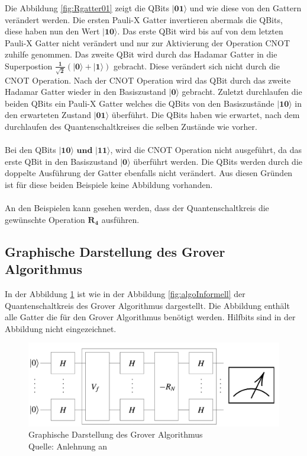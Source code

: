 \noindent
 Die Abbildung \ref{fig:Rgatter01} zeigt die QBits $\mathbf{|01\rangle}$  und wie diese von den Gattern verändert werden. Die ersten Pauli-X Gatter invertieren abermals die QBits, diese haben nun den Wert $\mathbf{|10\rangle}$. Das erste QBit wird bis auf von dem letzten Pauli-X Gatter nicht verändert und nur zur Aktivierung der Operation CNOT zuhilfe genommen. Das zweite QBit wird durch das Hadamar Gatter in die Superpostion $\mathbf{\frac{1}{\sqrt 2}(|0\rangle + |1\rangle)}$ gebracht. Diese verändert sich nicht durch die CNOT Operation. Nach der CNOT Operation wird das QBit durch das zweite Hadamar Gatter wieder in den Basiszustand $\mathbf{|0\rangle}$ gebracht. Zuletzt durchlaufen die beiden QBits ein Pauli-X Gatter welches die QBits von den Basiszustände $\mathbf{|10\rangle}$ in den erwarteten Zustand $\mathbf{|01\rangle}$ überführt. Die QBits haben wie erwartet, nach dem durchlaufen des Quantenschaltkreises die selben Zustände wie vorher.
  \\ 
  \\
Bei den QBits $\mathbf{|10\rangle \text{ und }|11\rangle}$, wird die CNOT Operation nicht ausgeführt, da das erste QBit in den Basiszustand $\mathbf{|0\rangle}$ überführt werden. Die QBits werden durch die doppelte Ausführung der Gatter ebenfalls nicht verändert. Aus diesen Gründen ist für diese beiden Beispiele keine Abbildung vorhanden.
\\
\\
An den Beispielen kann gesehen werden, dass der Quantenschaltkreis die gewünschte Operation $\mathbf{R_4}$ ausführen.

\subsection{Graphische Darstellung des Grover Algorithmus}
In der Abbildung \ref{fig:algoFormell} ist wie in der Abbildung \ref{fig:algoInformell} der Quantenschaltkreis des Grover Algorithmus dargestellt. Die Abbildung enthält alle Gatter die für den Grover Algorithmus benötigt werden. Hilfbits sind in der Abbildung nicht eingezeichnet.
\begin{figure}[hbtp]
	\centering
	\includegraphics[width=1\textwidth]{figures/algoFormell.png}
	\caption{Graphische Darstellung des Grover Algorithmus \\ Quelle: Anlehnung an \cite[S. 146]{Ho17} }
	\label{fig:algoFormell}
\end{figure}




